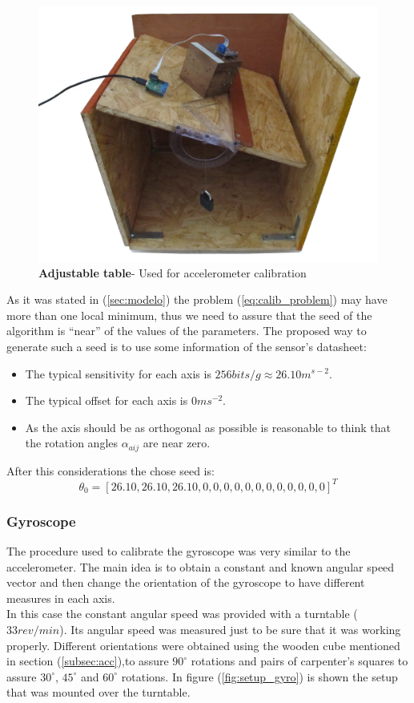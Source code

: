 \documentclass[conference]{IEEEtran}
\newcommand{\refp}[1]{(\ref{#1})}
\begin{document}
\begin{figure}
	\centering
	\includegraphics[width=.6\columnwidth]{./pics_paper/mesa.jpg}
	\caption{\textbf{Adjustable table}- Used for accelerometer calibration}
	\label{fig:mesa}
\end{figure}

As it was stated in \refp{sec:modelo} the problem \refp{eq:calib_problem} may have more than one local minimum, thus we need to assure that the seed of the algorithm is ``near'' of the values of the parameters. The proposed way to generate such a seed is to use some information of the sensor's datasheet\cite{bib:acc_data}: 

\begin{itemize}
\item The typical sensitivity for each axis is $256 bits/g \approx 26.10 m^{s-2}$.
\item The typical offset for each axis is $0 ms^{-2}$.
\item As the axis should be as orthogonal as possible is reasonable to think that the rotation angles $\alpha_{aij}$ are near zero. 
\end{itemize}

After this considerations the chose seed is:
\begin{equation}
{\theta}_0 = [26.10, 26.10, 26.10, 0, 0, 0, 0, 0, 0, 0, 0, 0, 0, 0, 0]^T
\end{equation}
\subsubsection{Gyroscope}

The procedure used to calibrate the gyroscope was very similar to the accelerometer. The main idea is to obtain a constant and known angular speed vector and then change the orientation of the gyroscope to have different measures in each axis.\\

In this case the constant angular speed was provided with a turntable ($33 rev/min$). Its angular speed was measured just to be sure that it was working properly. Different orientations were obtained using the wooden cube mentioned in section \refp{subsec:acc},to assure $90^\circ$ rotations and pairs of carpenter's squares to assure $30^\circ$, $45^\circ$ and $60^\circ$ rotations. In figure \refp{fig:setup_gyro} is shown the setup that was mounted over the turntable.\\
\end{document}
